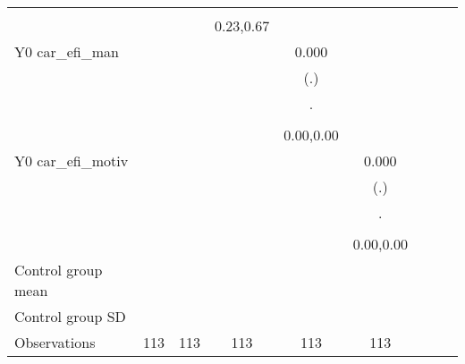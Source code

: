 \begin{table}[!h]
\begin{adjustbox}{width=\columnwidth,center}
\begin{tabular}{l*{8}{c}}
                    &                     &                     &                     &                     &                     \\
                    &                     &                     &   0.23,0.67         &                     &                     \\
Y0 car\_efi\_man      &                     &                     &                     &       0.000         &                     \\
                    &                     &                     &                     &         (.)         &                     \\
                    &                     &                     &                     &           .         &                     \\
                    &                     &                     &                     &                     &                     \\
                    &                     &                     &                     &   0.00,0.00         &                     \\
Y0 car\_efi\_motiv    &                     &                     &                     &                     &       0.000         \\
                    &                     &                     &                     &                     &         (.)         \\
                    &                     &                     &                     &                     &           .         \\
                    &                     &                     &                     &                     &                     \\
                    &                     &                     &                     &                     &   0.00,0.00         \\
\hline
Control group mean  &                     &                     &                     &                     &                     \\
Control group SD    &                     &                     &                     &                     &                     \\
Observations        &         113         &         113         &         113         &         113         &         113         \\

\end{tabular}
\end{adjustbox}
\end{table}
